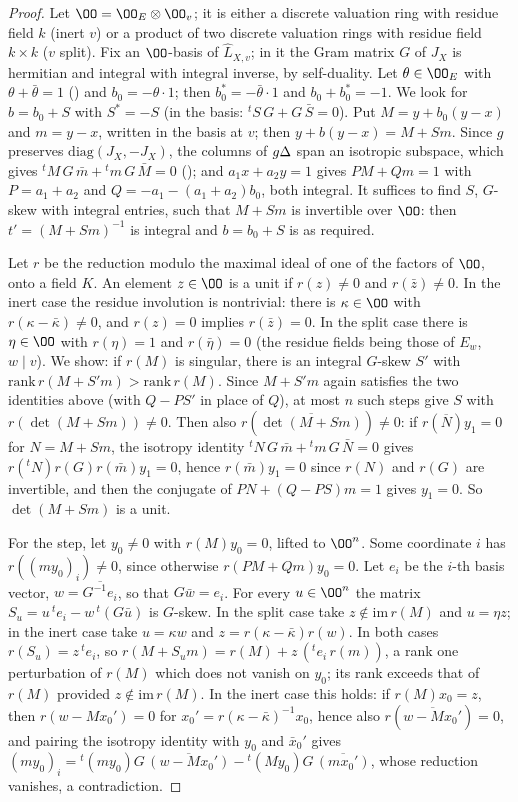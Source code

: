 \begin{proof}
Let $\OO=\OO_E\otimes\OO_v$; it is either a discrete valuation ring with residue field $k$ (inert $v$) or a product of two
discrete valuation rings with residue field $k\times k$ ($v$ split). Fix an $\OO$-basis of $\widehat L_{X,v}$; in it the Gram matrix $G$ of
$J_X$ is hermitian and integral with integral inverse, by self-duality. Let $\theta\in\OO_E$ with $\theta+\bar\theta=1$
() and $b_0=-\theta\cdot1$; then $b_0^*=-\bar\theta\cdot1$ and
$b_0+b_0^*=-1$. We look for $b=b_0+S$ with $S^*=-S$ (in the basis: ${}^tS\,G+G\,\bar S=0$). Put $M=y+b_0(y-x)$ and
$m=y-x$, written in the basis at $v$; then $y+b(y-x)=M+Sm$. Since $g$ preserves $\mathrm{diag}(J_X,-J_X)$, the columns of
$g\Delta$ span an isotropic subspace, which gives ${}^tM\,G\,\bar m+{}^tm\,G\,\bar M=0$ (); and
$a_1x+a_2y=1$ gives $PM+Qm=1$ with $P=a_1+a_2$ and $Q=-a_1-(a_1+a_2)b_0$, both integral. It suffices to find $S$, $G$-skew with
integral entries, such that $M+Sm$ is invertible over $\OO$: then $t'=(M+Sm)^{-1}$ is integral and $b=b_0+S$ is as required.

Let $r$ be the reduction modulo the maximal ideal of one of the factors of $\OO$, onto a field $K$. An element $z\in\OO$ is a unit if
$r(z)\ne0$ and $r(\bar z)\ne0$. In the inert case the residue involution is nontrivial: there is $\kappa\in\OO$ with $r(\kappa-\bar\kappa)\ne0$,
and $r(z)=0$ implies $r(\bar z)=0$. In the split case there is $\eta\in\OO$ with $r(\eta)=1$ and $r(\bar\eta)=0$
(the residue fields being those of $E_w$, $w\mid v$). We show: if $r(M)$ is singular, there is an integral $G$-skew $S'$ with
$\mathrm{rank}\,r(M+S'm)>\mathrm{rank}\,r(M)$. Since $M+S'm$ again satisfies the two identities above (with $Q-PS'$ in place of $Q$), at
most $n$ such steps give $S$ with $r(\det(M+Sm))\ne0$. Then also $r(\overline{\det(M+Sm)})\ne0$: if $r(\overline{N})y_1=0$ for
$N=M+Sm$, the isotropy identity ${}^tN\,G\,\bar m+{}^tm\,G\,\bar N=0$ gives $r({}^tN)r(G)r(\bar m)y_1=0$, hence $r(\bar m)y_1=0$ since $r(N)$ and
$r(G)$ are invertible, and then the conjugate of $PN+(Q-PS)m=1$ gives $y_1=0$. So $\det(M+Sm)$ is a unit.

For the step, let $y_0\ne0$ with $r(M)y_0=0$, lifted to $\OO^n$. Some coordinate $i$ has $r((my_0)_i)\ne0$, since otherwise
$r(PM+Qm)y_0=0$. Let $e_i$ be the $i$-th basis vector, $w=\overline{G^{-1}e_i}$, so that $G\bar w=e_i$. For every $u\in\OO^n$ the
matrix $S_u=u\,{}^te_i-w\,{}^t(G\bar u)$ is $G$-skew. In the split case take $z\notin\mathrm{im}\,r(M)$ and $u=\eta z$; in the inert case
take $u=\kappa w$ and $z=r(\kappa-\bar\kappa)r(w)$. In both cases $r(S_u)=z\,{}^te_i$, so $r(M+S_um)=r(M)+z\,({}^te_i\,r(m))$, a rank one
perturbation of $r(M)$ which does not vanish on $y_0$; its rank exceeds that of $r(M)$ provided $z\notin\mathrm{im}\,r(M)$. In the inert
case this holds: if $r(M)x_0=z$, then $r(w-Mx_0')=0$ for $x_0'=r(\kappa-\bar\kappa)^{-1}x_0$, hence also $r(\overline{w-Mx_0'})=0$, and
pairing the isotropy identity with $y_0$ and $\bar x_0'$ gives
$(my_0)_i={}^t(my_0)G\,\overline{(w-Mx_0')}-{}^t(My_0)G\,\overline{(mx_0')}$, whose reduction vanishes, a contradiction.
\end{proof}


